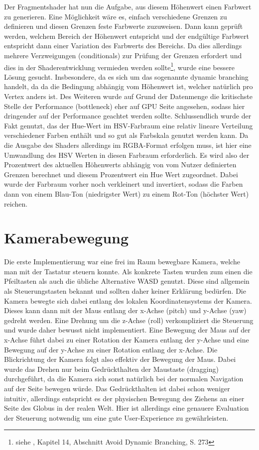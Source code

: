Der Fragmentshader hat nun die Aufgabe, aus diesem Höhenwert einen Farbwert zu generieren. Eine Möglichkeit wäre es, einfach verschiedene Grenzen zu definieren und diesen Grenzen feste Farbwerte zuzuweisen. Dann kann geprüft werden, welchem Bereich der Höhenwert entspricht und der endgültige Farbwert entspricht dann einer Variation des Farbwerts des Bereichs. Da dies allerdings mehrere Verzweigungen (conditionals) zur Prüfung der Grenzen erfordert und dies in der Shaderentwicklung vermieden werden sollte\footnote{siehe \cite{shaderDev}, Kapitel 14, Abschnitt Avoid Dynamic Branching, S. 273}, wurde eine bessere Lösung gesucht. Insbesondere, da es sich um das sogenannte dynamic branching handelt, da da die Bedingung abhängig vom Höhenwert ist, welcher natürlich pro Vertex anders ist. Des Weiteren wurde auf Grund der Datenmenge die kritischste Stelle der Performance (bottleneck) eher auf GPU Seite angesehen, sodass hier dringender auf der Performance geachtet werden sollte. Schlussendlich wurde der Fakt genutzt, das der Hue-Wert im HSV-Farbraum eine relativ lineare Verteilung verschiedener Farben enthält und so gut als Farbskala genutzt werden kann. Da die Ausgabe des Shaders allerdings im RGBA-Format erfolgen muss, ist hier eine Umwandlung des HSV Werten in diesen Farbraum erforderlich. Es wird also der Prozentwert des aktuellen Höhenwerts abhängig von vom Nutzer definierten Grenzen berechnet und diesem Prozentwert ein Hue Wert zugeordnet. Dabei wurde der Farbraum vorher noch verkleinert und invertiert, sodass die Farben dann von einem Blau-Ton (niedrigster Wert) zu einem Rot-Ton (höchster Wert) reichen. 

\section{Kamerabewegung}
Die erste Implementierung war eine frei im Raum bewegbare Kamera, welche man mit der Tastatur steuern konnte. Als konkrete Tasten wurden zum einen die Pfeiltasten als auch die übliche Alternative WASD genutzt. Diese sind allgemein als Steuerungstasten bekannt und sollten daher keiner Erklärung bedürfen. Die Kamera bewegte sich dabei entlang des lokalen Koordinatensystems der Kamera. Dieses kann dann mit der Maus entlang der x-Achse (pitch) und y-Achse (yaw) gedreht werden. Eine Drehung um die z-Achse (roll) verkompliziert die Steuerung und wurde daher bewusst nicht implementiert. Eine Bewegung der Maus auf der x-Achse führt dabei zu einer Rotation der Kamera entlang der y-Achse und eine Bewegung auf der y-Achse zu einer Rotation entlang der x-Achse. Die Blickrichtung der Kamera folgt also effektiv der Bewegung der Maus. Dabei wurde das Drehen nur beim Gedrückthalten der Maustaste (dragging) durchgeführt, da die Kamera sich sonst natürlich bei der normalen Navigation auf der Seite bewegen würde. Das Gedrückthalten ist dabei schon weniger intuitiv, allerdings entspricht es der physischen Bewegung des Ziehens an einer Seite des Globus in der realen Welt. Hier ist allerdings eine genauere Evaluation der Steuerung notwendig um eine gute User-Experience zu gewährleisten.


